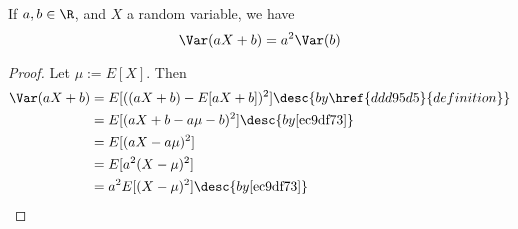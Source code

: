 \label{b340cf6}

If $a,b\in\R$, and $X$ a random variable, we have
$$
  \Var(aX+b)=a^2\Var(b)
$$

\begin{proof}
  Let $\mu:=E[X]$. Then
  \begin{align*}
    \Var(aX+b)
     &= E[((aX+b)-E[aX+b])^2]\desc{by \href{ddd95d5}{definition}} \\
     &= E[(aX+b-a\mu-b)^2]\desc{by \autoref{ec9df73}}             \\
     &= E[(aX-a\mu)^2]                                            \\
     &= E[a^2(X-\mu)^2]                                           \\
     &= a^2E[(X-\mu)^2]\desc{by \autoref{ec9df73}}
  \end{align*}
\end{proof}
